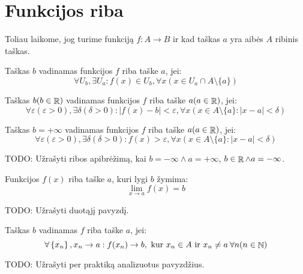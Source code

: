 \section{Funkcijos riba}

\begin{note}
  Toliau laikome, jog turime funkciją $f : A \to B$ ir kad taškas $a$ 
  yra aibės $A$ ribinis taškas.
\end{note}

\begin{defn}
  \label{limfed}
  Taškas $b$ vadinamas funkcijos $f$ riba taške $a$, jei:
  \[
  \forall U_b, \exists U_a : f(x) \in U_b,%
  \forall x (x \in U_a \cap A \setminus \{a\})
  \]
\end{defn}

\begin{defn}
  Taškas $b (b \in \mathop{\mathbb{R}})$ vadinamas funkcijos $f$ riba taške 
  $a (a \in \mathop{\mathbb{R}})$, jei:
  \[
  \forall \varepsilon (\varepsilon > 0), \exists \delta (\delta > 0):%
  |f(x) - b| < \varepsilon,%
  \forall x (x \in A \setminus \{a\} : |x - a| < \delta)
  \]
\end{defn}

\begin{defn}
  Taškas $b = +\infty$ vadinamas funkcijos $f$ riba taške $a (a \in \mathop{\mathbb{R}})$,
  jei:
  \[
  \forall \varepsilon (\varepsilon > 0), \exists \delta (\delta > 0) :%
  f(x) > \varepsilon,%
  \forall x (x \in A \setminus \{a\} : |x - a| < \delta)
  \]
\end{defn}

TODO: Užrašyti ribos apibrėžimą, kai $b=-\infty \land a=+\infty$, 
$b \in \mathop{\mathbb{R}} \land a=-\infty$.

\begin{notation}
  Funkcijos $f(x)$ riba taške $a$, kuri lygi $b$ žymima:
  \[
  \lim_{x \to a} f(x) = b
  \]
\end{notation}

TODO: Užrašyti duotąjį pavyzdį.

\begin{defn}
  \label{limfs}
  Taškas $b$ vadinamas $f$ riba taške $a$, jei:
  \[
  \forall \left\{ x_{n} \right\}, x_{n} \to a :%
  f(x_{n}) \to b, \text{ kur } x_{n} \in A \text{ ir } x_{n} \neq a \:%
  \forall n (n \in \NSET)%
  \]
\end{defn}

TODO: Užrašyti per praktiką analizuotus pavyzdžius.


